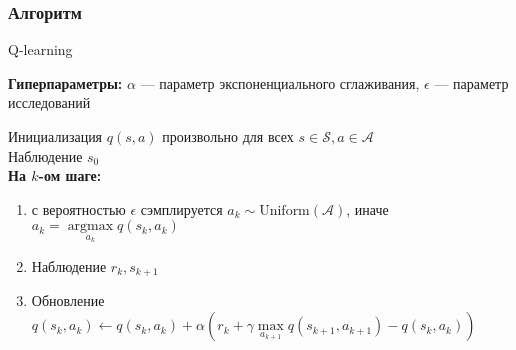 \documentclass[notheorems]{beamer} %
\DeclareMathOperator*{\argmax}{argmax}
\begin{document}
\begin{frame}
	
	\frametitle{Алгоритм}
	\begin{algorithm}[H]
		\caption{Q-learning}\label{ql}
		\textbf{Гиперпараметры:} $\alpha$ --- параметр экспоненциального сглаживания, $\epsilon$ --- параметр исследований
		
		\vspace{0.3cm}
		Инициализация $q(s, a)$ произвольно для всех $s \in \mathcal{S}, a \in \mathcal{A}$ \\
		Наблюдение $s_0$ \\ 
		\textbf{На $k$-ом шаге:}
		\begin{enumerate}
			\item с вероятностью $\epsilon$ сэмплируется $a_k \sim \text{Uniform}(\mathcal{A})$, иначе $a_k = \argmax\limits_{a_k} q(s_k, a_k)$
			\item Наблюдение $r_k, s_{k+1}$
			\item Обновление $q(s_k, a_k) \leftarrow q(s_k, a_k) + \alpha \left( r_k + \gamma \max\limits_{a_{k+1}} q(s_{k+1}, a_{k+1}) - q(s_k, a_k) \right)$
		\end{enumerate}
	\end{algorithm}
\end{frame}


\end{document}
